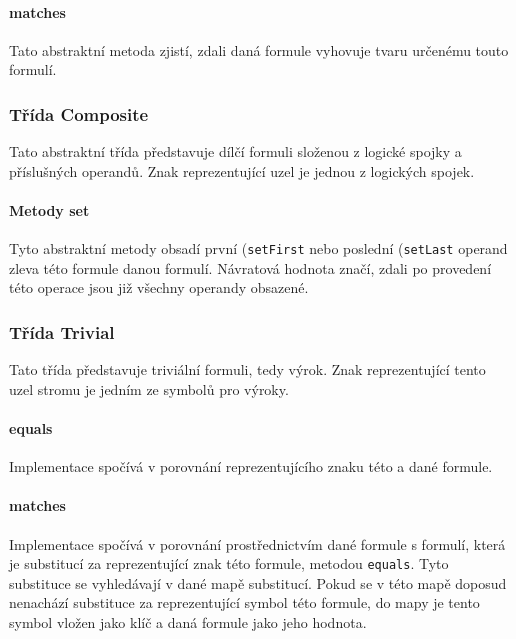 \documentclass[thesis=B,czech,hidelinks]{thesis}[2012/06/26]
\begin{document}
\paragraph{matches}

Tato abstraktní metoda zjistí, zdali daná formule vyhovuje tvaru určenému touto formulí.

\subsubsection{Třída Composite}

Tato abstraktní třída představuje dílčí formuli složenou z logické spojky a příslušných operandů. Znak reprezentující uzel je jednou z logických spojek.

\paragraph{Metody set}

Tyto abstraktní metody obsadí první (\texttt{setFirst} nebo poslední (\texttt{setLast} operand zleva této formule danou formulí. Návratová hodnota značí, zdali po provedení této operace jsou již všechny operandy obsazené.

\subsubsection{Třída Trivial}

Tato třída představuje triviální formuli, tedy výrok. Znak reprezentující tento uzel stromu je jedním ze symbolů pro výroky.

\paragraph{equals}

Implementace spočívá v porovnání reprezentujícího znaku této a dané formule.

\paragraph{matches}

Implementace spočívá v porovnání prostřednictvím dané formule s formulí, která je substitucí za reprezentující znak této formule, metodou \texttt{equals}. Tyto substituce se vyhledávají v dané mapě substitucí. Pokud se v této mapě doposud nenachází substituce za reprezentující symbol této formule, do mapy je tento symbol vložen jako klíč a daná formule jako jeho hodnota.
\end{document}
